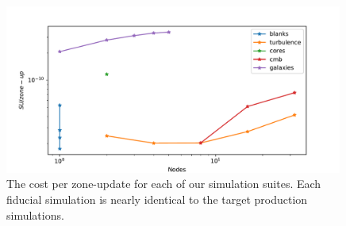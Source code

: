 \documentclass[11pt]{NSF}  %
\begin{document}
\begin{figure} \begin{center}
    \includegraphics[width=0.99\textwidth]{figs/g47_zoneup.pdf}
\caption[ ]{The cost per zone-update for each of our simulation suites.  
Each fiducial simulation is nearly identical to the target production
simulations.
    }

\label{fig.scaling} \end{center} \end{figure}




\end{document}
